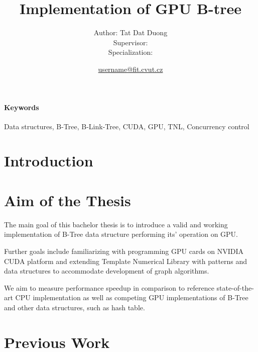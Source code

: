 \documentclass{article}
\title{Implementation of GPU B-tree} %
\author{
    \small Author: Tat Dat Duong\\
    \small Supervisor: \\
    \small Specialization:
} %
\date{\small \url{username@fit.cvut.cz}}
\begin{document}
\maketitle              

\paragraph{Keywords}{Data structures, B-Tree, B-Link-Tree, CUDA, GPU, TNL, Concurrency control}

\section{Introduction}

\section{Aim of the Thesis}
The main goal of this bachelor thesis is to introduce a valid and working implementation of B-Tree data structure performing its' operation on GPU. 

Further goals include familiarizing with programming GPU cards on NVIDIA CUDA platform and extending Template Numerical Library with patterns and data structures to accommodate development of graph algorithms. 

We aim to measure performance speedup in comparison to reference state-of-the-art CPU implementation as well as competing GPU implementations of B-Tree and other data structures, such as hash table.

\section{Previous Work}

\end{document}
